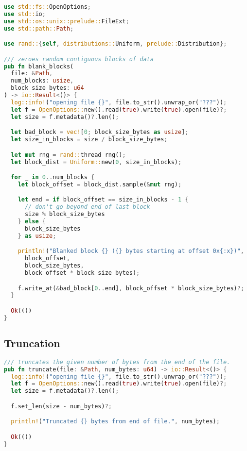 \begin{lstlisting}[language=Rust]
use std::fs::OpenOptions;
use std::io;
use std::os::unix::prelude::FileExt;
use std::path::Path;

use rand::{self, distributions::Uniform, prelude::Distribution};

/// zeroes random contiguous blocks of data
pub fn blank_blocks(
  file: &Path,
  num_blocks: usize,
  block_size_bytes: u64
) -> io::Result<()> {
  log::info!("opening file {}", file.to_str().unwrap_or("???"));
  let f = OpenOptions::new().read(true).write(true).open(file)?;
  let size = f.metadata()?.len();

  let bad_block = vec![0; block_size_bytes as usize];
  let size_in_blocks = size / block_size_bytes;

  let mut rng = rand::thread_rng();
  let block_dist = Uniform::new(0, size_in_blocks);

  for _ in 0..num_blocks {
    let block_offset = block_dist.sample(&mut rng);

    let end = if block_offset == size_in_blocks - 1 {
      // don't go beyond end of last block
      size % block_size_bytes
    } else {
      block_size_bytes
    } as usize;

    println!("Blanked block {} ({} bytes starting at offset 0x{:x})",
      block_offset,
      block_size_bytes,
      block_offset * block_size_bytes);

    f.write_at(&bad_block[0..end], block_offset * block_size_bytes)?;
  }

  Ok(())
}
\end{lstlisting}

\newpage

\subsection{Truncation}

\begin{lstlisting}[language=Rust]
/// truncates the given number of bytes from the end of the file.
pub fn truncate(file: &Path, num_bytes: u64) -> io::Result<()> {
  log::info!("opening file {}", file.to_str().unwrap_or("???"));
  let f = OpenOptions::new().read(true).write(true).open(file)?;
  let size = f.metadata()?.len();

  f.set_len(size - num_bytes)?;

  println!("Truncated {} bytes from end of file.", num_bytes);

  Ok(())
}
\end{lstlisting}

